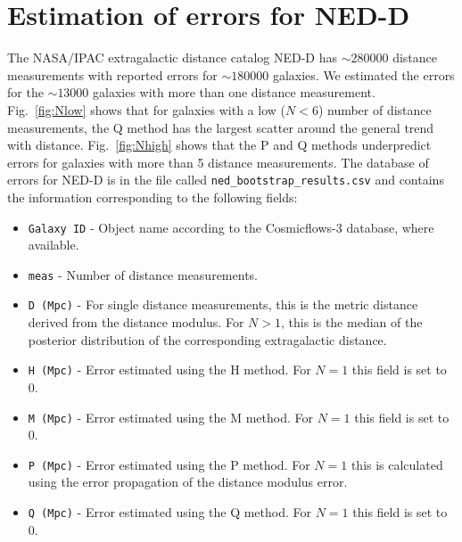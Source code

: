 \documentclass[a4paper,fleqn,usenatbib]{mnras}
\begin{document}
\section{Estimation of errors for NED-D}
The NASA/IPAC extragalactic distance catalog NED-D has $\sim280000$ distance measurements with reported errors for $\sim180000$ galaxies. We estimated the errors for the $\sim13000$ galaxies with more than one distance measurement. Fig.~\ref{fig:Nlow} shows that for galaxies with a low ($N<6$) number of distance measurements, the Q method has the largest scatter around the general trend with distance. Fig.~\ref{fig:Nhigh} shows that the P and Q methods underpredict errors for galaxies with more than 5 distance measurements. The database of errors for NED-D is in the file called \texttt{ned\_bootstrap\_results.csv} and contains the information corresponding to the following fields:
\begin{itemize}
\item \texttt{Galaxy ID} - Object name according to the Cosmicflows-3 database, where available.
\item \texttt{meas} - Number of distance measurements.
\item \texttt{D (Mpc)} - For single distance measurements, this is the metric distance derived from the distance modulus. For $N>1$, this is the median of the posterior distribution of the corresponding extragalactic distance.
\item \texttt{H (Mpc)} - Error estimated using the H method. For $N=1$ this field is set to 0.
\item \texttt{M (Mpc)} - Error estimated using the M method. For $N=1$ this field is set to 0.
\item \texttt{P (Mpc)} - Error estimated using the P method. For $N=1$ this is calculated using the error propagation of the distance modulus error.
\item \texttt{Q (Mpc)} - Error estimated using the Q method. For $N=1$ this field is set to 0.
\end{itemize}
\end{document}
